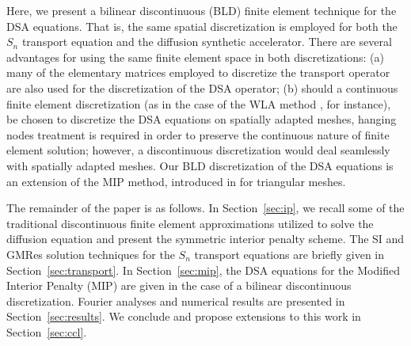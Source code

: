 \documentclass{mc2013}
\renewcommand{\(}{\left(}
\renewcommand{\)}{\right)}
\renewcommand{\[}{\left[}
\renewcommand{\]}{\right]}
\newcommand{\sn}{\ensuremath{S_n}\xspace}
\begin{document}
Here, we present a bilinear discontinuous (BLD) finite element technique for the DSA equations.
That is, the same spatial discretization is employed for both the \sn transport equation and the diffusion 
synthetic accelerator. There are
several advantages for using the same finite element space in both discretizations: 
(a) many of the elementary matrices employed to discretize the
transport operator are also used for the discretization of the DSA operator; 
(b) should a continuous finite element discretization (as in the case of the WLA method \cite{wla}, for instance),
be chosen to discretize the DSA equations on spatially adapted meshes, hanging nodes treatment is required 
in order to preserve the continuous nature of finite element solution; however, a discontinuous discretization 
would deal seamlessly with spatially adapted meshes. Our BLD discretization of the DSA equations is an extension of
the MIP method, introduced in \cite{mip} for triangular meshes.

The remainder of the paper is as follows. In Section~\ref{sec:ip}, we recall some of the traditional 
discontinuous finite element approximations utilized to solve the diffusion equation and present the symmetric
interior penalty scheme. The SI and GMRes solution techniques for the
\sn transport equations are briefly given in Section~\ref{sec:transport}. In Section~\ref{sec:mip}, the DSA equations
for the Modified Interior Penalty (MIP) are given in the case of a bilinear discontinuous discretization. Fourier
analyses and numerical results are presented in Section~\ref{sec:results}. We conclude and 
propose extensions to this work in Section~\ref{sec:ccl}.


 \label{sec:ip}
\end{document}
